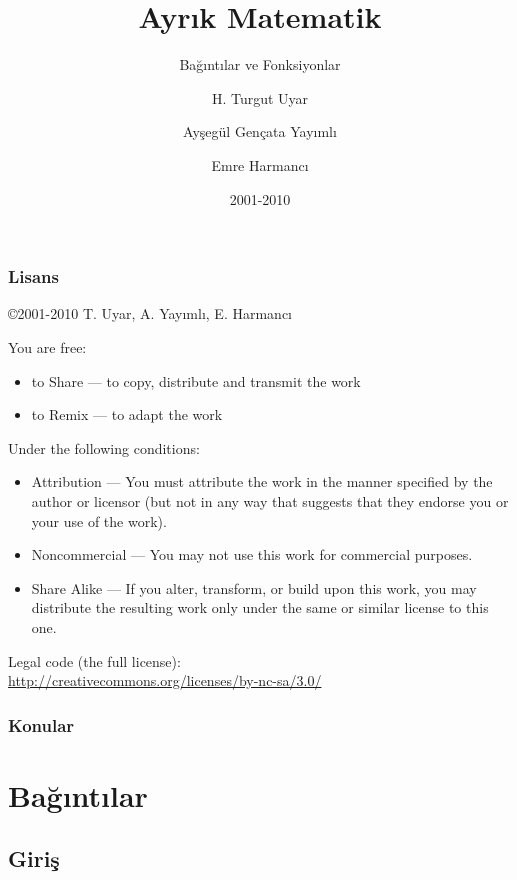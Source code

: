 \documentclass[dvipsnames]{beamer}
\title{Ayrık Matematik}
\subtitle{Bağıntılar ve Fonksiyonlar}
\author{H. Turgut Uyar \and Ayşegül Gençata Yayımlı \and Emre Harmancı}
\date{2001-2010}
\theoremstyle{definition}
\theoremstyle{example}
\theoremstyle{plain}
\begin{document}
\begin{frame}
  \titlepage
\end{frame}

\begin{frame}
  \frametitle{Lisans}

  \hfill
  \copyright 2001-2010 T. Uyar, A. Yayımlı, E. Harmancı

  \vfill
  \begin{tiny}
    You are free:
    \begin{itemize}
      \item to Share — to copy, distribute and transmit the work
      \item to Remix — to adapt the work
    \end{itemize}

    Under the following conditions:
    \begin{itemize}
      \item Attribution — You must attribute the work in the manner specified by
        the author or licensor (but not in any way that suggests that they
        endorse you or your use of the work).

      \item Noncommercial — You may not use this work for commercial purposes.

      \item Share Alike — If you alter, transform, or build upon this work, you
        may distribute the resulting work only under the same or similar license
        to this one.
    \end{itemize}
  \end{tiny}

  \vfill
  Legal code (the full license):\\
  \url{http://creativecommons.org/licenses/by-nc-sa/3.0/}
\end{frame}

\begin{frame}
  \frametitle{Konular}
  \tableofcontents
\end{frame}

\section{Bağıntılar}

\subsection{Giriş}
\end{document}
